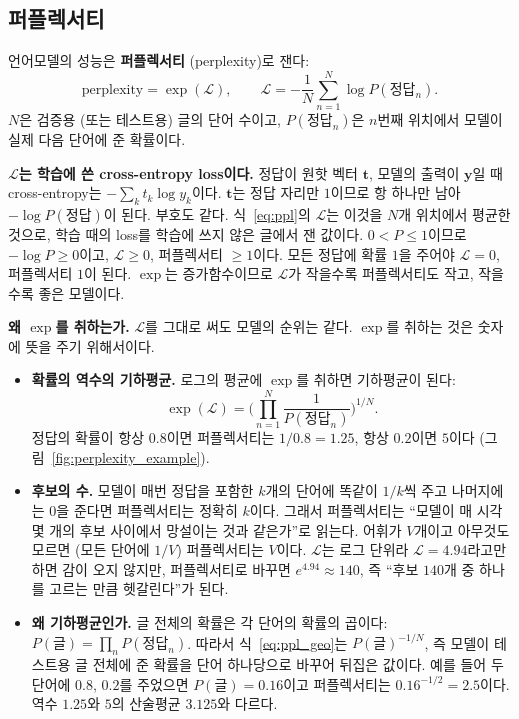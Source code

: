 \documentclass[11pt,a4paper]{article}
\newcommand{\figref}[1]{그림~\ref{fig:#1}}
\newcommand{\eqnref}[1]{식~\eqref{eq:#1}}
\newcommand{\vect}[1]{\bm{#1}}
\newcommand{\loss}{\mathcal{L}}
\begin{document}
\subsection{퍼플렉서티}

언어모델의 성능은 \textbf{퍼플렉서티} (perplexity)로 잰다:
\begin{equation}\label{eq:ppl}
\text{perplexity}=\exp(\loss),\qquad \loss=-\frac1N\sum_{n=1}^N\log P(\text{정답}_n).
\end{equation}
$N$은 검증용 (또는 테스트용) 글의 단어 수이고, $P(\text{정답}_n)$은 $n$번째 위치에서 모델이 실제 다음 단어에 준 확률이다.

\textbf{$\loss$는 학습에 쓴 cross-entropy loss이다.} 정답이 원핫 벡터 $\vect t$, 모델의 출력이 $\vect y$일 때 cross-entropy는 $-\sum_k t_k\log y_k$이다.
$\vect t$는 정답 자리만 $1$이므로 항 하나만 남아 $-\log P(\text{정답})$이 된다. 부호도 같다.
\eqnref{ppl}의 $\loss$는 이것을 $N$개 위치에서 평균한 것으로, 학습 때의 loss를 학습에 쓰지 않은 글에서 잰 값이다.
$0<P\le1$이므로 $-\log P\ge0$이고, $\loss\ge0$, 퍼플렉서티 $\ge1$이다. 모든 정답에 확률 $1$을 주어야 $\loss=0$, 퍼플렉서티 $1$이 된다.
$\exp$는 증가함수이므로 $\loss$가 작을수록 퍼플렉서티도 작고, 작을수록 좋은 모델이다.

\textbf{왜 $\exp$를 취하는가.} $\loss$를 그대로 써도 모델의 순위는 같다. $\exp$를 취하는 것은 숫자에 뜻을 주기 위해서이다.
\begin{itemize}[leftmargin=1.5em]
\item \textbf{확률의 역수의 기하평균.} 로그의 평균에 $\exp$를 취하면 기하평균이 된다:
\begin{equation}\label{eq:ppl_geo}
\exp(\loss)=\Big(\prod_{n=1}^N\frac{1}{P(\text{정답}_n)}\Big)^{1/N}.
\end{equation}
정답의 확률이 항상 $0.8$이면 퍼플렉서티는 $1/0.8=1.25$, 항상 $0.2$이면 $5$이다 (\figref{perplexity_example}).
\item \textbf{후보의 수.} 모델이 매번 정답을 포함한 $k$개의 단어에 똑같이 $1/k$씩 주고 나머지에는 $0$을 준다면 퍼플렉서티는 정확히 $k$이다.
그래서 퍼플렉서티는 ``모델이 매 시각 몇 개의 후보 사이에서 망설이는 것과 같은가''로 읽는다. 어휘가 $V$개이고 아무것도 모르면 (모든 단어에 $1/V$) 퍼플렉서티는 $V$이다.
$\loss$는 로그 단위라 $\loss=4.94$라고만 하면 감이 오지 않지만, 퍼플렉서티로 바꾸면 $e^{4.94}\approx140$, 즉 ``후보 $140$개 중 하나를 고르는 만큼 헷갈린다''가 된다.
\item \textbf{왜 기하평균인가.} 글 전체의 확률은 각 단어의 확률의 곱이다: $P(\text{글})=\prod_nP(\text{정답}_n)$. 따라서 \eqnref{ppl_geo}는 $P(\text{글})^{-1/N}$, 즉 모델이 테스트용 글 전체에 준 확률을 단어 하나당으로 바꾸어 뒤집은 값이다.
예를 들어 두 단어에 $0.8$, $0.2$를 주었으면 $P(\text{글})=0.16$이고 퍼플렉서티는 $0.16^{-1/2}=2.5$이다. 역수 $1.25$와 $5$의 산술평균 $3.125$와 다르다.
\end{itemize}
\end{document}
